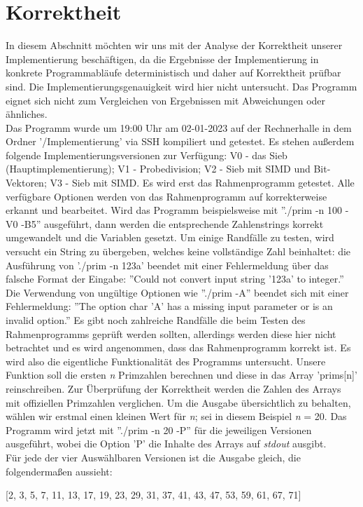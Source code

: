 \documentclass[course=erap]{aspdoc}
\begin{document}
\section{Korrektheit}
In diesem Abschnitt möchten wir uns mit der Analyse der Korrektheit unserer Implementierung beschäftigen, 
da die Ergebnisse der Implementierung in konkrete Programmabläufe deterministisch und daher auf Korrektheit prüfbar sind. 
Die Implementierungsgenauigkeit wird hier nicht untersucht. 
Das Programm eignet sich nicht zum Vergleichen von Ergebnissen mit Abweichungen oder ähnliches.\\ 
Das Programm wurde um 19:00 Uhr am 02-01-2023 auf der Rechnerhalle in dem Ordner '/Implementierung' via SSH kompiliert und getestet. Es stehen außerdem folgende Implementierungsversionen zur Verfügung: V0 - das Sieb (Hauptimplementierung); V1 - Probedivision; V2 - Sieb mit SIMD und Bit-Vektoren; V3 - Sieb mit SIMD. Es wird erst das Rahmenprogramm getestet. Alle verfügbare Optionen werden von das Rahmenprogramm auf korrekterweise erkannt und bearbeitet. Wird das Programm beispielsweise mit ''./prim -n 100 -V0 -B5'' ausgeführt, dann werden die entsprechende Zahlenstrings
korrekt umgewandelt und die Variablen gesetzt. Um einige Randfälle zu testen, wird versucht ein String zu übergeben, welches keine vollständige Zahl beinhaltet: die Ausführung von './prim -n 123a' beendet mit einer Fehlermeldung über das falsche Format der Eingabe: ''Could not convert input string '123a' to integer.''
Die Verwendung von ungültige Optionen wie ''./prim -A'' beendet sich mit einer Fehlermeldung: ''The option char 'A' has a missing input parameter or is an invalid option.'' Es gibt noch zahlreiche Randfälle die beim Testen des Rahmenprogramms geprüft werden sollten, allerdings werden diese hier nicht betrachtet und es wird angenommen, dass das Rahmenprogramm korrekt ist. Es wird also die eigentliche Funktionalität des Programms untersucht. 
Unsere Funktion soll die ersten \textit{n} Primzahlen berechnen und diese in das Array 'prims[n]' reinschreiben. Zur Überprüfung der Korrektheit werden die Zahlen des Arrays mit offiziellen Primzahlen verglichen. Um die Ausgabe übersichtlich zu behalten, wählen wir erstmal einen kleinen Wert für \textit{n}; sei in diesem Beispiel \textit{n} = 20. Das Programm wird jetzt mit ''./prim -n 20 -P'' für die jeweiligen Versionen ausgeführt, wobei die Option 'P' die Inhalte des Arrays auf \textit{stdout} ausgibt. \\
Für jede der vier Auswählbaren Versionen ist die Ausgabe gleich, die folgendermaßen aussieht: \begin{center} [2, 3, 5, 7, 11, 13, 17, 19, 23, 29, 31, 37, 41, 43, 47, 53, 59, 61, 67, 71] \end{center}
\end{document}
